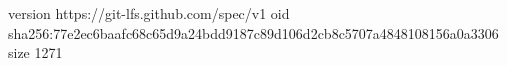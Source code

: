 version https://git-lfs.github.com/spec/v1
oid sha256:77e2ec6baafc68c65d9a24bdd9187c89d106d2cb8c5707a4848108156a0a3306
size 1271
